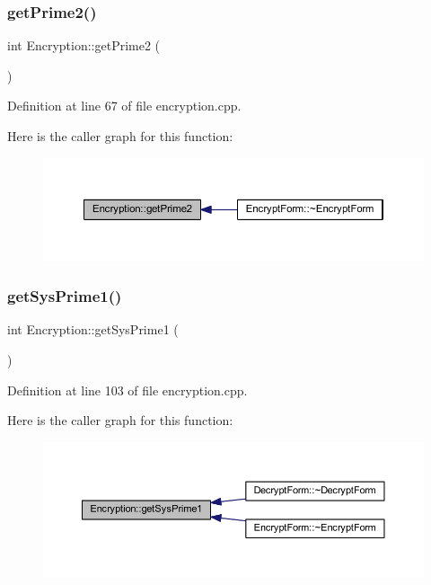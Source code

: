 \subsubsection{\texorpdfstring{get\+Prime2()}{getPrime2()}}
{\footnotesize\ttfamily int Encryption\+::get\+Prime2 (\begin{DoxyParamCaption}{ }\end{DoxyParamCaption})}



Definition at line 67 of file encryption.\+cpp.

Here is the caller graph for this function\+:\nopagebreak
\begin{figure}[H]
\begin{center}
\leavevmode
\includegraphics[width=350pt]{class_encryption_ab4089ae7185f6c10fcea6b6d697872c2_icgraph}
\end{center}
\end{figure}
\hypertarget{class_encryption_ab182872a04d40023eebb199abfe81896}{}\label{class_encryption_ab182872a04d40023eebb199abfe81896} 
\subsubsection{\texorpdfstring{get\+Sys\+Prime1()}{getSysPrime1()}}
{\footnotesize\ttfamily int Encryption\+::get\+Sys\+Prime1 (\begin{DoxyParamCaption}{ }\end{DoxyParamCaption})}



Definition at line 103 of file encryption.\+cpp.

Here is the caller graph for this function\+:\nopagebreak
\begin{figure}[H]
\begin{center}
\leavevmode
\includegraphics[width=350pt]{class_encryption_ab182872a04d40023eebb199abfe81896_icgraph}
\end{center}
\end{figure}
\hypertarget{class_encryption_a4a18c3b332487ec393c3ddf06c39c48f}{}\label{class_encryption_a4a18c3b332487ec393c3ddf06c39c48f} 
